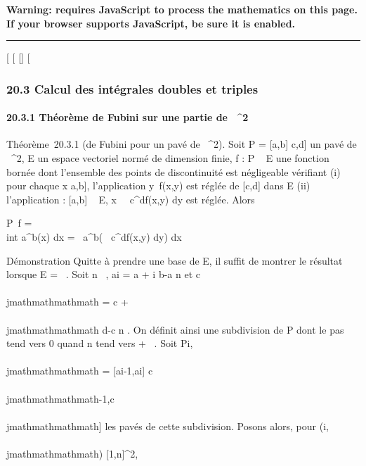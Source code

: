\textbf{Warning: 
requires JavaScript to process the mathematics on this page.\\ If your
browser supports JavaScript, be sure it is enabled.}

\begin{center}\rule{3in}{0.4pt}\end{center}

{[}
{[}
{[}{]}
{[}

\subsubsection{20.3 Calcul des intégrales doubles et triples}

\paragraph{20.3.1 Théorème de Fubini sur une partie de ~^2}

Théorème~20.3.1 (de Fubini pour un pavé de ~^2). Soit P =
{[}a,b{]} \times {[}c,d{]} un pavé de ~^2, E un espace vectoriel
normé de dimension finie, f : P \rightarrow~ E une fonction bornée dont l'ensemble
des points de discontinuité est négligeable vérifiant (i) pour chaque x
\in {[}a,b{]}, l'application y\mapsto~f(x,y) est
réglée de {[}c,d{]} dans E (ii) l'application \phi : {[}a,b{]} \rightarrow~ E,
x\mapsto~\int ~
c^df(x,y) dy est réglée. Alors

\int  P~f =\\int
 a^b\phi(x) dx =\int ~
a^b\left (\int ~
c^df(x,y) dy\right ) dx

Démonstration Quitte à prendre une base de E, il suffit de montrer le
résultat lorsque E = ~. Soit n \in {}~, ai = a + i b-a
\over n et c\\\\jmathmathmathmath = c + \\\\jmathmathmathmath d-c
\over n . On définit ainsi une subdivision \sigman
de P dont le pas tend vers 0 quand n tend vers + \infty~. Soit Pi,\\\\jmathmathmathmath
= {[}ai-1,ai{]} \times {[}c\\\\jmathmathmathmath-1,c\\\\jmathmathmathmath{]}
les pavés de cette subdivision. Posons alors, pour (i,\\\\jmathmathmathmath) \in
{[}1,n{]}^2,

